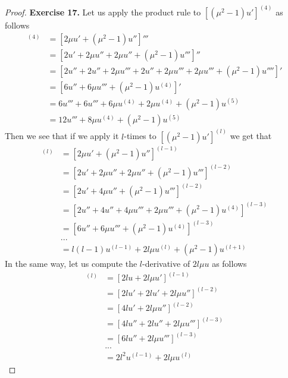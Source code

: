 \documentclass[11pt]{article}
\theoremstyle{definition}
\begin{document}
\cleardoublepage
\begin{proof}{\textbf{Exercise 17.}}
Let us apply the product rule to $[(\mu^2 - 1)u']^{(4)}$ as follows
\begin{align*}
    [(\mu^2 - 1)u']^{(4)} &= [2\mu u' + (\mu^2 - 1)u'']'''\\
    &= [2u' + 2\mu u'' + 2\mu u'' + (\mu^2 - 1)u''']''\\
    &= [2u'' + 2u'' + 2\mu u''' + 2u'' + 2\mu u''' + 2\mu u''' + (\mu^2 - 1)u'''']'\\
    &= [6u'' + 6\mu u''' + (\mu^2 - 1)u^{(4)}]'\\
    &= 6u''' + 6u''' + 6\mu u^{(4)} + 2\mu u^{(4)} + (\mu^2 - 1)u^{(5)}\\
    &= 12u''' + 8\mu u^{(4)} + (\mu^2 - 1)u^{(5)}
\end{align*}
Then we see that if we apply it $l$-times to $[(\mu^2 - 1)u']^{(l)}$
we get that
\begin{align*}
    [(\mu^2 - 1)u']^{(l)} &= [2\mu u' + (\mu^2 - 1)u'']^{(l -1)}\\
    &= [2 u' + 2\mu u'' + 2\mu u'' + (\mu^2 - 1)u''']^{(l-2)}\\
    &= [2 u' + 4\mu u'' + (\mu^2 - 1)u''']^{(l-2)}\\
    &= [2 u'' + 4 u'' + 4\mu u''' + 2\mu u''' + (\mu^2 - 1)u^{(4)}]^{(l-3)}\\
    &= [6 u'' + 6\mu u''' + (\mu^2 - 1)u^{(4)}]^{(l-3)}\\
    &...\\
    &= l(l - 1)u^{(l-1)} + 2l\mu u^{(l)} + (\mu^2 - 1)u^{(l + 1)}
\end{align*}
In the same way, let us compute the $l$-derivative of $2l\mu u$ as follows
\begin{align*}
    [2l\mu u]^{(l)} &= [2lu + 2l\mu u']^{(l-1)}\\
    &= [2lu' + 2lu' + 2l\mu u'']^{(l-2)}\\
    &= [4lu' + 2l\mu u'']^{(l-2)}\\
    &= [4lu'' + 2lu'' + 2l\mu u''']^{(l-3)}\\
    &= [6lu'' + 2l\mu u''']^{(l-3)}\\
    &...\\
    &= 2l^2u^{(l - 1)} + 2l\mu u^{(l)}
\end{align*}
\end{proof}
\end{document}
